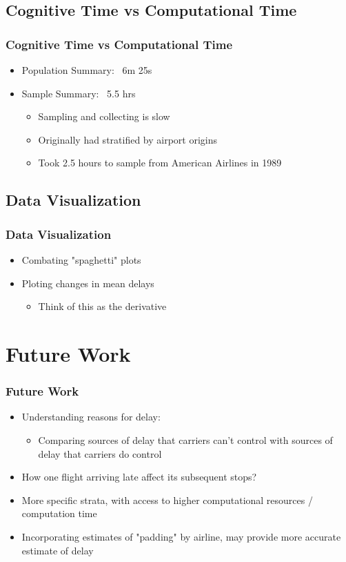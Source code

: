 \documentclass{beamer}
\begin{document}
\subsection{Cognitive Time vs Computational Time}
\begin{frame}
\frametitle{Cognitive Time vs Computational Time}
\begin{itemize}
\item Population Summary: ~6m 25s
\item Sample Summary: ~5.5 hrs 
\begin{itemize}
\item Sampling and collecting is slow 
\item Originally had stratified by airport origins 
\item Took 2.5 hours to sample from American Airlines in 1989
\end{itemize}
\end{itemize}

\end{frame}

\subsection{Data Visualization}
\begin{frame}
\frametitle{Data Visualization}
\begin{itemize}
\item Combating "spaghetti" plots
\item Ploting changes in mean delays 
\begin{itemize}
\item Think of this as the derivative 
\end{itemize}
\end{itemize}

\end{frame}

\section{Future Work}
\begin{frame}
\frametitle{Future Work}
\begin{itemize}
\item Understanding reasons for delay: 
\begin{itemize}
\item Comparing sources of delay that carriers can't control with sources of delay that carriers do control 
\end{itemize}
\item How one flight arriving late affect its subsequent stops? 
\item More specific strata, with access to higher computational resources / computation time
\item Incorporating estimates of "padding" by airline, may provide more accurate estimate of delay
\end{itemize}

\end{frame}
\end{document}
